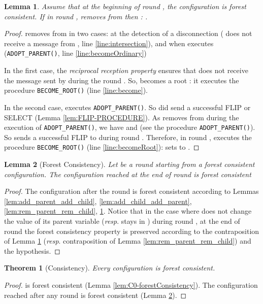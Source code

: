 \documentclass[twocolumn]{article}
\newtheorem{lemma}{Lemma}
\newtheorem{theorem}{Theorem}
\newcommand{\depends}[1]{}
\begin{document}
\begin{lemma}
  \label{lem:rem_child_rem_parent}
Assume that at the beginning of round , the configuration is forest consistent.  
 If in round ,  removes  from  
then  : .
\end{lemma}
\begin{proof}
 removes  from  in two cases: 
at the detection of a disconnection 
( does not receive a message from , line \ref{line:intersection}), and
when  executes (\texttt{ADOPT\_PARENT()}, line \ref{line:becomeOrdinary}) 

In the first case, the \textit{reciprocal reception property} ensures that 
 does not receive the message sent by  during the round .
So,  becomes a root : it executes the procedure
\texttt{BECOME\_ROOT()} (line \ref{line:become}).

In the second case,  executes \texttt{ADOPT\_PARENT()}.
So  did send a successful FLIP or SELECT (Lemma \ref{lem:FLIP-PROCEDURE}).
As  removes  from  during the execution of
\texttt{ADOPT\_PARENT()},
  we have  and
 (see the procedure \texttt{ADOPT\_PARENT()}).
So  sends
a successful FLIP to   during round .
Therefore, in round ,  
executes the procedure \texttt{BECOME\_ROOT()} (line \ref{line:becomeRoot}):
 sets  to .
 \end{proof}


\begin{lemma}[Forest Consistency]
\label{lem:consistency}
Let  be a round starting from a forest consistent configuration.
The configuration reached at the end of round  is forest consistent
\depends{\ref{lem:add_parent_add_child}, \ref{lem:add_child_add_parent}, \ref{lem:rem_parent_rem_child}, \ref{lem:rem_child_rem_parent}}
\end{lemma}
\begin{proof}
The configuration after the round  is forest consistent according 
to Lemmas \ref{lem:add_parent_add_child}, \ref{lem:add_child_add_parent}, 
\ref{lem:rem_parent_rem_child}, \ref{lem:rem_child_rem_parent}. 
Notice that in the case where  does not change the value of its parent variable (\textit{resp}. 
 stays  in ) during round , at the end of round  the forest consistency 
property is preserved according to the contraposition of Lemma \ref{lem:rem_child_rem_parent} 
(\textit{resp}. contraposition of Lemma \ref{lem:rem_parent_rem_child}) and the hypothesis.
 \end{proof}

\begin{theorem}[Consistency]
\label{th:consistency}
Every configuration is forest consistent.
\end{theorem}
\begin{proof}
 is forest consistent (Lemma \ref{lem:C0-forestConsistency}).
The configuration reached after any round is 
forest consistent (Lemma \ref{lem:consistency}).
 \end{proof}
\end{document}
